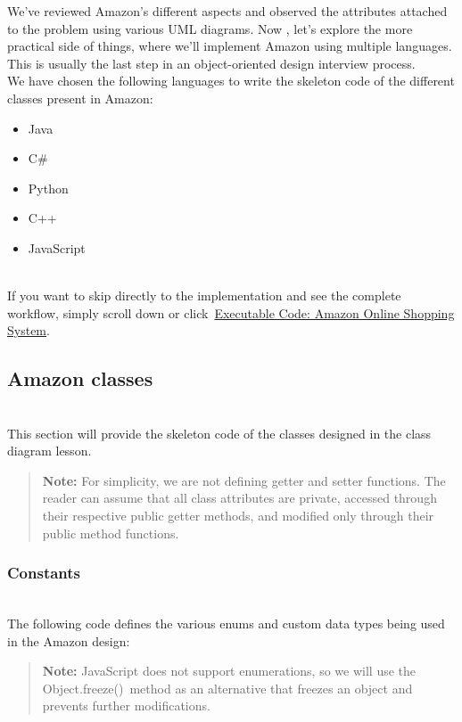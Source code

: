 

We've reviewed Amazon's different aspects and observed the attributes attached to the problem using various UML diagrams. Now , let's explore the more practical side of things, where we'll implement Amazon using multiple languages. This is usually the last step in an object-oriented design interview process.
\\
We have chosen the following languages to write the skeleton code of the different classes present in Amazon:

\begin{itemize}
\item
\protect{}\label{sGareDrLIyf6WSi7gZREL}
Java
\item
\protect{}\label{veQRBPlFazZNvZpQDR6iZ}
C\#
\item
\protect{}\label{VNLCRVe6vx12AYoq4GhBX}
Python
\item
\protect{}\label{CIPLXwc9Gld31YlE7NrGB}
C++
\item
\protect{}\label{ZF8PWbh_JW__I7JBSsSGy}
JavaScript
\end{itemize}
\\
If you want to skip directly to the implementation and see the complete workflow, simply scroll down or click~\hyperref[Executable-code-Amazon-online-shopping-system]{Executable Code: Amazon Online Shopping System}.

\subsection{Amazon classes}\label{3Kc_WSGNh9BOYfaEPXewu}
\\
This section will provide the skeleton code of the classes designed in the class diagram lesson.
\begin{quote}
\textbf{Note:} For simplicity, we are not defining getter and setter functions. The reader can assume that all class attributes are private, accessed through their respective public getter methods, and modified only through their public method functions.
\end{quote}
\subsubsection{Constants}\label{1DftBh-vIsuKI400oYwWO}
\\
The following code defines the various enums and custom data types being used in the Amazon design:
\begin{quote}
\textbf{Note:} JavaScript does not support enumerations, so we will use the Object.freeze()\ method as an alternative that freezes an object and prevents further modifications.
\end{quote}

